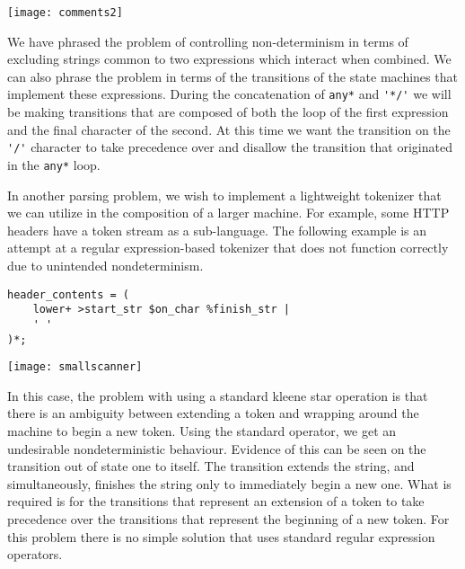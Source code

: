 \documentclass[letterpaper,11pt,oneside]{book}
\newenvironment{inline_code}{\def\baselinestretch{1}\vspace{12pt}\small}{}
\begin{document}
\begin{center}
\texttt{[image: comments2]}
\end{center}


We have phrased the problem of controlling non-determinism in terms of
excluding strings common to two expressions which interact when combined.
We can also phrase the problem in terms of the transitions of the state
machines that implement these expressions. During the concatenation of
\verb|any*| and \verb|'*/'| we will be making transitions that are composed of
both the loop of the first expression and the final character of the second.
At this time we want the transition on the \verb|'/'| character to take precedence
over and disallow the transition that originated in the \verb|any*| loop.

In another parsing problem, we wish to implement a lightweight tokenizer that we can
utilize in the composition of a larger machine. For example, some HTTP headers
have a token stream as a sub-language. The following example is an attempt
at a regular expression-based tokenizer that does not function correctly due to
unintended nondeterminism.

\begin{inline_code}
\begin{verbatim}
header_contents = ( 
    lower+ >start_str $on_char %finish_str | 
    ' '
)*;
\end{verbatim}
\end{inline_code}

\begin{center}
\texttt{[image: smallscanner]}
\end{center}

In this case, the problem with using a standard kleene star operation is that
there is an ambiguity between extending a token and wrapping around the machine
to begin a new token. Using the standard operator, we get an undesirable
nondeterministic behaviour. Evidence of this can be seen on the transition out
of state one to itself.  The transition extends the string, and simultaneously,
finishes the string only to immediately begin a new one.  What is required is
for the
transitions that represent an extension of a token to take precedence over the
transitions that represent the beginning of a new token. For this problem
there is no simple solution that uses standard regular expression operators.
\end{document}
